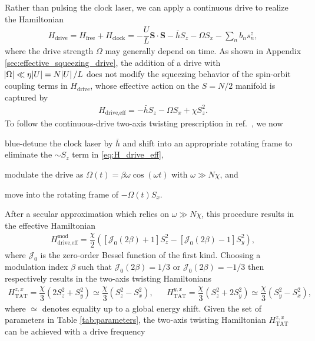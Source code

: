 \documentclass[aps,notitlepage,nofootinbib,11pt]{revtex4-1}
\renewcommand{\t}{\text} %
\newcommand{\f}[2]{\dfrac{#1}{#2}} %
\newcommand{\p}[1]{\left(#1\right)} %
\renewcommand{\sp}[1]{\left[#1\right]} %
\renewcommand{\v}{\bm} %
\renewcommand{\c}{\cdot} %
\newcommand{\J}{\mathcal{J}}
\newcommand{\1}{\mathds{1}}
\begin{document}
Rather than pulsing the clock laser, we can apply a continuous drive
to realize the Hamiltonian
\begin{align}
  H_{\t{drive}} = H_{\t{free}} + H_{\t{clock}}
  = -\f{U}{L} \v S\c\v S - \bar h S_z - \Omega S_x - \sum_n b_n s_n^z,
\end{align}
where the drive strength $\Omega$ may generally depend on time.  As
shown in Appendix \ref{sec:effective_squeezing_drive}, the addition of
a drive with $\abs{\Omega}\ll\eta\abs{U}=N\abs{U}/L$ does not modify
the squeezing behavior of the spin-orbit coupling terms in
$H_{\t{drive}}$, whose effective action on the $S=N/2$ manifold is
captured by
\begin{align}
  H_{\t{drive,eff}} = -\bar h S_z - \Omega S_x + \chi S_z^2.
  \label{eq:H_drive_eff}
\end{align}
To follow the continuous-drive two-axis twisting prescription in
ref.~\cite{huang2015twoaxis}, we now
\begin{enumerate*}[label=(\roman*)]
\item blue-detune the clock laser by $\bar h$ and shift into an
  appropriate rotating frame to eliminate the $\sim S_z$ term in
  \eqref{eq:H_drive_eff},
\item modulate the drive as $\Omega\p{t}=\beta\omega\cos\p{\omega t}$
  with $\omega\gg N\chi$, and
\item move into the rotating frame of $-\Omega\p{t}S_x$.
\end{enumerate*}
After a secular approximation which relies on $\omega\gg N\chi$, this
procedure results in the effective Hamiltonian
\begin{align}
  H_{\t{drive,eff}}^{\t{mod}}
  = \f{\chi}{2} \p{\sp{\J_0\p{2\beta}+1} S_z^2
    - \sp{\J_0\p{2\beta}-1} S_y^2},
\end{align}
where $\J_0$ is the zero-order Bessel function of the first kind.
Choosing a modulation index $\beta$ such that $\J_0\p{2\beta}=1/3$ or
$\J_0\p{2\beta}=-1/3$ then respectively results in the two-axis
twisting Hamiltonians
\begin{align}
  H_{\t{TAT}}^{z,x}
  = \f{\chi}{3} \p{2 S_z^2 + S_y^2}
  \simeq \f{\chi}{3} \p{S_z^2 - S_x^2},
  &&
  H_{\t{TAT}}^{y,x}
  = \f{\chi}{3} \p{S_z^2 + 2 S_y^2}
  \simeq \f{\chi}{3}\p{S_y^2 - S_x^2},
  \label{eq:H_TAT_drive}
\end{align}
where $\simeq$ denotes equality up to a global energy shift. Given the
set of parameters in Table \ref{tab:parameters}, the two-axis twisting
Hamiltonian $H_{\t{TAT}}^{z,x}$ can be achieved with a drive frequency
\end{document}
